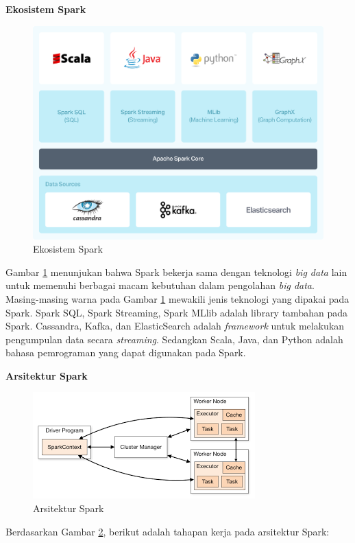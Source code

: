 \documentclass[a4paper,twoside]{article}
\begin{document}
\begin{enumerate}
\textbf{Ekosistem Spark}
\begin{figure}[H]
	\centering
	\includegraphics[scale=0.18]{spark_ecosystem}
	\caption{Ekosistem Spark}
	\label{fig:spark_ecosystem}
\end{figure}
Gambar \ref{fig:spark_ecosystem} menunjukan bahwa Spark bekerja sama dengan teknologi \textit{big data} lain untuk memenuhi berbagai macam kebutuhan dalam pengolahan \textit{big data}. Masing-masing warna pada Gambar \ref{fig:spark_ecosystem} mewakili jenis teknologi yang dipakai pada Spark. Spark SQL, Spark Streaming, Spark MLlib adalah library tambahan pada Spark. Cassandra, Kafka, dan ElasticSearch adalah \textit{framework} untuk melakukan pengumpulan data secara \textit{streaming}. Sedangkan Scala, Java, dan Python adalah bahasa pemrograman yang dapat digunakan pada Spark.

\newpage
\textbf{Arsitektur Spark}

\begin{figure}[H]
	\centering
	\includegraphics[scale=0.78]{arsitektur_spark2}
	\caption{Arsitektur Spark}
	\label{fig:arsitektur_spark2}
\end{figure}
Berdasarkan Gambar \ref{fig:arsitektur_spark2}, berikut adalah tahapan kerja pada arsitektur Spark:


\end{enumerate}
\end{document}
